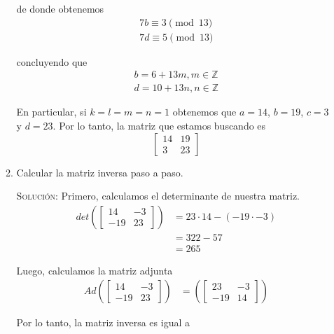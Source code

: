 \documentclass[letterpaper,10pt]{article}
\begin{document}
\begin{enumerate}
\begin{enumerate}
        de donde obtenemos 
        \begin{align*}
            7b \equiv 3 \pmod{13} \\
            7d \equiv 5 \pmod{13}
        \end{align*}
        
        concluyendo que 
        \begin{align*}
            b = 6 + 13m, m \in \mathbb{Z} \\
            d = 10 + 13n, n \in \mathbb{Z}
        \end{align*}
        
        En particular, si $k = l = m = n = 1$ obtenemos que $a = 14$, $b = 19$,
        $c = 3$ y $d = 23$. Por lo tanto, la matriz que estamos buscando es
        \begin{equation*}
            \begin{bmatrix} 14 & 19 \\ 3 & 23\end{bmatrix} 
        \end{equation*}


        \item Calcular la matriz inversa paso a paso.
        
        \textsc{Solución:} Primero, calculamos el determinante de nuestra 
        matriz.
        \begin{align*}
            det(\begin{bmatrix} 14 & -3 \\ -19 & 23\end{bmatrix}) 
            &= 23 \cdot 14 - (-19 \cdot -3) \\
            &= 322 - 57 \\
            &= 265
        \end{align*}
        
        Luego, calculamos la matriz adjunta
        \begin{align*}
            Ad(\begin{bmatrix} 14 & -3 \\ -19 & 23\end{bmatrix}) 
            &= (\begin{bmatrix} 23 & -3 \\ -19 & 14\end{bmatrix})
        \end{align*}
        
        Por lo tanto, la matriz inversa es igual a 



\end{enumerate}
\end{enumerate}
\end{document}

